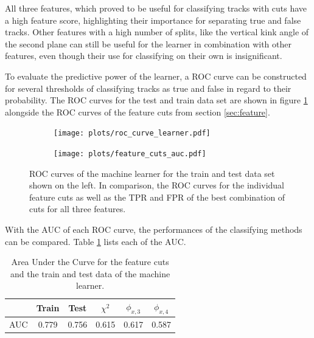 All three features, which proved to be useful for classifying tracks with cuts have a high feature score, highlighting their importance for separating true and false tracks.
Other features with a high number of splits, like the vertical kink angle of the second plane can still be useful for the learner in combination with other features, even though
their use for classifying on their own is insignificant.

To evaluate the predictive power of the learner, a ROC curve can be constructed for several thresholds of classifying tracks as true and false in regard to
their probability. The ROC curves for the test and train data set are shown in figure \ref{fig:auc_comparison} alongside the ROC curves of the feature cuts from section \ref{sec:feature}.


\begin{figure}
  \hspace{-2.5cm}
  \begin{subfigure}{0.62\textwidth}
      \centering
      \texttt{[image: plots/roc\_curve\_learner.pdf]}
  \end{subfigure}
  \begin{subfigure}{0.62\textwidth}
      \hspace{0.95cm}
      \texttt{[image: plots/feature\_cuts\_auc.pdf]}
  \end{subfigure}
  \caption{ROC curves of the machine learner for the train and test data set shown on the left. In comparison, the ROC curves for the individual feature cuts as well as the
  TPR and FPR of the best combination of cuts for all three features.}
  \label{fig:auc_comparison}
\end{figure}

With the AUC of each ROC curve, the performances of the classifying methods can be compared. Table \ref{tab:AUC} lists each of the AUC.

\begin{table}
  \centering
  \begin{tabular}{c | c c c c c}
    \toprule
      & Train & Test & $\chi^2$ & $\phi_{x,3}$ & $\phi_{x,4}$\\
    \midrule
    AUC & 0.779 & 0.756 & 0.615 & 0.617 & 0.587 \\
  \end{tabular}
  \caption{Area Under the Curve for the feature cuts and the train and test data of the machine learner.}
  \label{tab:AUC}
\end{table}

